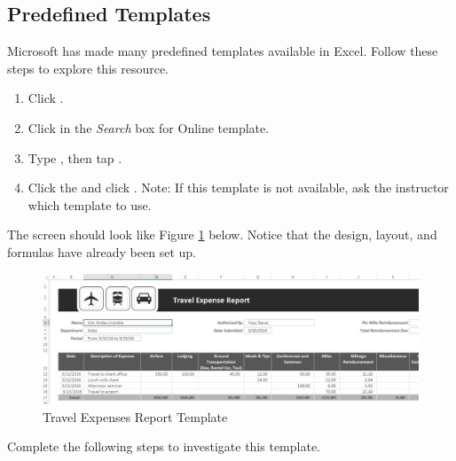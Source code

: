 \subsection{Predefined Templates}

Microsoft has made many predefined templates available in Excel. Follow these steps to explore this resource.

\begin{enumbox}
	\begin{enumerate}
		\item Click .
		\item Click in the \textit{Search} box for Online template.
		\item Type , then tap .
		\item Click the  and click . Note: If this template is not available, ask the instructor which template to use.
	\end{enumerate}
\end{enumbox}

The screen should look like Figure \ref{06:fig09} below. Notice that the design, layout, and formulas have already been set up.

\begin{figure}[H]
	\centering
	\includegraphics[width=\maxwidth{.95\linewidth}]{gfx/ch06_fig09}
	\caption{Travel Expenses Report Template}
	\label{06:fig09}
\end{figure}

Complete the following steps to investigate this template.

